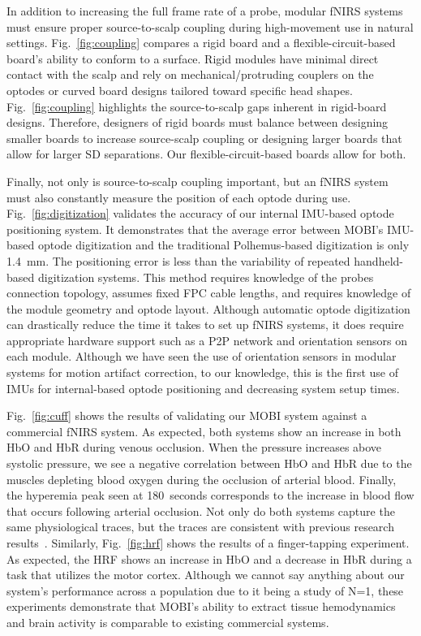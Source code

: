 In addition to increasing the full frame rate of a probe, modular \ac{fNIRS} systems must ensure proper source-to-scalp coupling during high-movement use in natural settings. Fig.~\ref{fig:coupling} compares a rigid board and a flexible-circuit-based board's ability to conform to a surface. Rigid modules have minimal direct contact with the scalp and rely on mechanical/protruding couplers on the optodes or curved board designs tailored toward specific head shapes. Fig.~\ref{fig:coupling} highlights the source-to-scalp gaps inherent in rigid-board designs. Therefore, designers of rigid boards must balance between designing smaller boards to increase source-scalp coupling or designing larger boards that allow for larger \ac{SD} separations. Our flexible-circuit-based boards allow for both. 

Finally, not only is source-to-scalp coupling important, but an \ac{fNIRS} system must also constantly measure the position of each optode during use. Fig.~\ref{fig:digitization} validates the accuracy of our internal \ac{IMU}-based optode positioning system. It demonstrates that the average error between \ac{MOBI}'s \ac{IMU}-based optode digitization and the traditional Polhemus-based digitization is only 1.4~mm. The positioning error is less than the variability of repeated handheld-based digitization systems. This method requires knowledge of the probes connection topology, assumes fixed \ac{FPC} cable lengths, and requires knowledge of the module geometry and optode layout. Although automatic optode digitization can drastically reduce the time it takes to set up \ac{fNIRS} systems, it does require appropriate hardware support such as a \ac{P2P} network and orientation sensors on each module. Although we have seen the use of orientation sensors in modular systems for motion artifact correction, to our knowledge, this is the first use of \ac{IMU}s for internal-based optode positioning and decreasing system setup times.

Fig.~\ref{fig:cuff} shows the results of validating our \ac{MOBI} system against a commercial \ac{fNIRS} system. As expected, both systems show an increase in both \ac{HbO} and \ac{HbR} during venous occlusion. When the pressure increases above systolic pressure, we see a negative correlation between \ac{HbO} and \ac{HbR} due to the muscles depleting blood oxygen during the occlusion of arterial blood. Finally, the hyperemia peak seen at 180~seconds corresponds to the increase in blood flow that occurs following arterial occlusion. Not only do both systems capture the same physiological traces, but the traces are consistent with previous research results~\cite{Liu2022}. Similarly, Fig.~\ref{fig:hrf} shows the results of a finger-tapping experiment. As expected, the \ac{HRF} shows an increase in \ac{HbO} and a decrease in \ac{HbR} during a task that utilizes the motor cortex. Although we cannot say anything about our system's performance across a population due to it being a study of N=1, these experiments demonstrate that \ac{MOBI}'s ability to extract tissue hemodynamics and brain activity is comparable to existing commercial systems. 

